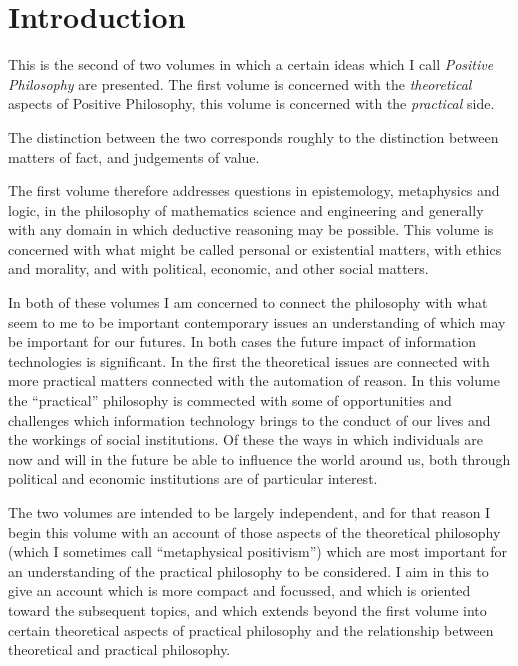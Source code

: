 
\chapter{Introduction}

This is the second of two volumes in which a certain ideas which I call \emph{Positive Philosophy} are presented.
The first volume \cite{rbjb004} is concerned with the \emph{theoretical} aspects of Positive Philosophy, this volume is concerned with the \emph{practical} side.

The distinction between the two corresponds roughly to the distinction between matters of fact, and judgements of value.

The first volume therefore addresses questions in epistemology, metaphysics and logic, in the philosophy of mathematics science and engineering and generally with any domain in which deductive reasoning may be possible.
This volume is concerned with what might be called personal or existential matters, with ethics and morality, and with political, economic, and other social matters.

In both of these volumes I am concerned to connect the philosophy with what seem to me to be important contemporary issues an understanding of which may be important for our futures.
In both cases the future impact of information technologies is significant.
In the first the theoretical issues are connected with more practical matters connected with the automation of reason.
In this volume the ``practical'' philosophy is commected with some of opportunities and challenges which information technology brings to the conduct of our lives and the workings of social institutions.
Of these the ways in which individuals are now and will in the future be able to influence the world around us, both through political and economic institutions are of particular interest.

The two volumes are intended to be largely independent, and for that reason I begin this volume with an account of those aspects of the theoretical philosophy (which I sometimes call ``metaphysical positivism'') which are most important for an understanding of the practical philosophy to be considered.
I aim in this to give an account which is more compact and focussed, and which is oriented toward the subsequent topics, and which extends beyond the first volume into certain theoretical aspects of practical philosophy and the relationship between theoretical and practical philosophy.

